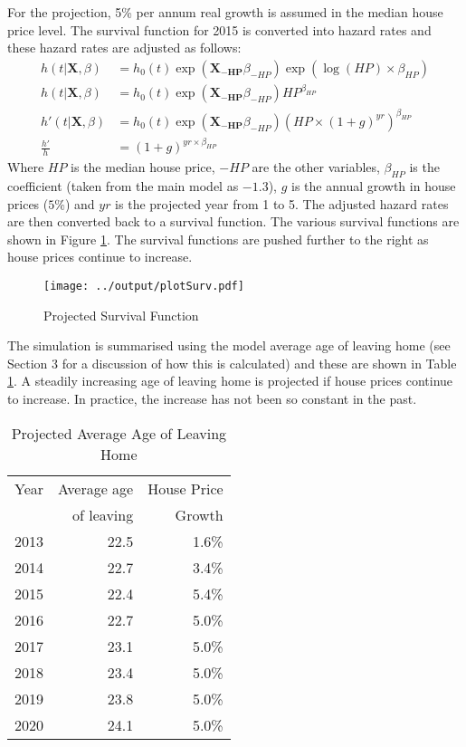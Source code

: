 \documentclass[12pt]{article}
\begin{document}
For the projection, 5\% per annum real growth is assumed in the median house price level. The survival function for 2015 is converted into hazard rates and these hazard rates are adjusted as follows:
\begin{align*}
    h(t|\mathbf{X}, \beta) &= h_0( t ) \exp( \mathbf{X_{-HP}}\beta_{-HP})  \exp ( \log(HP) \times  \beta_{HP} ) \\
    h(t|\mathbf{X}, \beta) &= h_0( t ) \exp( \mathbf{X_{-HP}}\beta_{-HP})  HP^{\beta_{HP}}  \\
    h'(t|\mathbf{X}, \beta) &= h_0( t ) \exp( \mathbf{X_{-HP}}\beta_{-HP}) (HP \times (1+g)^{yr})^{\beta_{HP}} \\
    \frac{h'}{h} &= (1+g)^{yr \times \beta_{HP}}
\end{align*}
Where $HP$ is the median house price, $-HP$ are the other variables, $\beta_{HP}$ is the coefficient (taken from the main model as $-1.3$), $g$ is the annual growth in house prices ($5\%$) and $yr$ is the projected year from 1 to 5. The adjusted hazard rates are then converted back to a survival function. The various survival functions are shown in Figure \ref{plotSurv}. The survival functions are pushed further to the right as house prices continue to increase.
\begin{figure}[htpb]
  \caption{Projected Survival Function}
  \label{plotSurv}
  \centering
  \texttt{[image: ../output/plotSurv.pdf]}
\end{figure}

The simulation is summarised using the model average age of leaving home (see Section 3 for a discussion of how this is calculated) and these are shown in Table \ref{ProgAvgAges}. A steadily increasing age of leaving home is projected if house prices continue to increase. In practice, the increase has not been so constant in the past.

\begin{table}[htbp]
\centering
\caption{Projected Average Age of Leaving Home}
\label{ProgAvgAges}
\begin{tabular}{lrr}
\toprule
Year & Average age & House Price \\
& of leaving & Growth \\
\midrule
2013 & 22.5 & 1.6\% \\
  2014 & 22.7 & 3.4\% \\
  2015 & 22.4 & 5.4\% \\
  2016 & 22.7 & 5.0\% \\
  2017 & 23.1 & 5.0\% \\
  2018 & 23.4 & 5.0\% \\
  2019 & 23.8 & 5.0\% \\
  2020 & 24.1 & 5.0\% \\
\bottomrule
\end{tabular}

\end{table}
\end{document}
